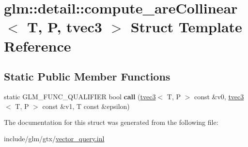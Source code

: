 \hypertarget{structglm_1_1detail_1_1compute__areCollinear_3_01T_00_01P_00_01tvec3_01_4}{}\section{glm\+:\+:detail\+:\+:compute\+\_\+are\+Collinear$<$ T, P, tvec3 $>$ Struct Template Reference}
\label{structglm_1_1detail_1_1compute__areCollinear_3_01T_00_01P_00_01tvec3_01_4}
\subsection*{Static Public Member Functions}
\begin{DoxyCompactItemize}
\item 
\mbox{\label{structglm_1_1detail_1_1compute__areCollinear_3_01T_00_01P_00_01tvec3_01_4_a4a9fce4b46bc6906c0b6b44c31accdb1}} 
static G\+L\+M\+\_\+\+F\+U\+N\+C\+\_\+\+Q\+U\+A\+L\+I\+F\+I\+ER bool {\bfseries call} (\hyperlink{structglm_1_1tvec3}{tvec3}$<$ T, P $>$ const \&v0, \hyperlink{structglm_1_1tvec3}{tvec3}$<$ T, P $>$ const \&v1, T const \&epsilon)
\end{DoxyCompactItemize}


The documentation for this struct was generated from the following file\+:\begin{DoxyCompactItemize}
\item 
include/glm/gtx/\hyperlink{vector__query_8inl}{vector\+\_\+query.\+inl}\end{DoxyCompactItemize}
